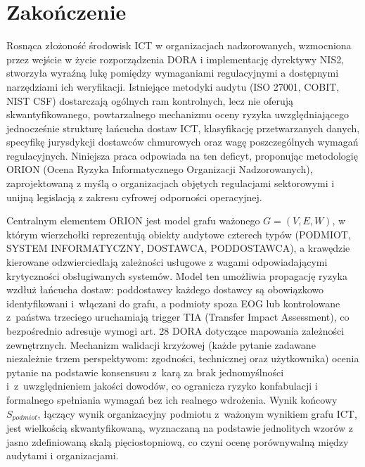 \chapter{Zakończenie}

Rosnąca złożoność środowisk ICT w organizacjach nadzorowanych, wzmocniona przez wejście w życie rozporządzenia DORA i implementację dyrektywy NIS2, stworzyła wyraźną lukę pomiędzy wymaganiami regulacyjnymi a dostępnymi narzędziami ich weryfikacji. Istniejące metodyki audytu (ISO 27001, COBIT, NIST CSF) dostarczają ogólnych ram kontrolnych, lecz nie oferują skwantyfikowanego, powtarzalnego mechanizmu oceny ryzyka uwzględniającego jednocześnie strukturę łańcucha dostaw ICT, klasyfikację przetwarzanych danych, specyfikę jurysdykcji dostawców chmurowych oraz wagę poszczególnych wymagań regulacyjnych. Niniejsza praca odpowiada na ten deficyt, proponując metodologię ORION (Ocena Ryzyka Informatycznego Organizacji Nadzorowanych), zaprojektowaną z myślą o organizacjach objętych regulacjami sektorowymi i unijną legislacją z zakresu cyfrowej odporności operacyjnej.

Centralnym elementem ORION jest model grafu ważonego $G = (V, E, W)$, w którym wierzchołki reprezentują obiekty audytowe czterech typów (PODMIOT, SYSTEM INFORMATYCZNY, DOSTAWCA, PODDOSTAWCA), a krawędzie kierowane odzwierciedlają zależności usługowe z wagami odpowiadającymi krytyczności obsługiwanych systemów. Model ten umożliwia propagację ryzyka wzdłuż łańcucha dostaw: poddostawcy każdego dostawcy są obowiązkowo identyfikowani i~włączani do grafu, a podmioty spoza EOG lub kontrolowane z~państwa trzeciego uruchamiają trigger TIA (Transfer Impact Assessment), co bezpośrednio adresuje wymogi art. 28 DORA dotyczące mapowania zależności zewnętrznych. Mechanizm walidacji krzyżowej (każde pytanie zadawane niezależnie trzem perspektywom: zgodności, technicznej oraz użytkownika) ocenia pytanie na podstawie konsensusu z~karą za brak jednomyślności i~z~uwzględnieniem jakości dowodów, co ogranicza ryzyko konfabulacji i formalnego spełniania wymagań bez ich realnego wdrożenia. Wynik końcowy $S_{podmiot}$, łączący wynik organizacyjny podmiotu z~ważonym wynikiem grafu ICT, jest wielkością skwantyfikowaną, wyznaczaną na podstawie jednolitych wzorów z jasno zdefiniowaną skalą pięciostopniową, co czyni ocenę porównywalną między audytami i organizacjami.


